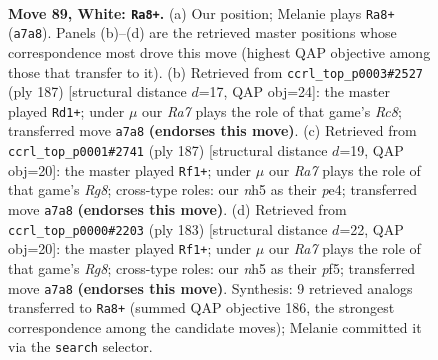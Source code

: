 \documentclass[11pt]{article}
\begin{document}
\clearpage

\begin{figure}[p]\centering
\begin{subfigure}{0.46\textwidth}\centering
\resizebox{\linewidth}{!}{%
\newchessgame
\chessboard[
  setfen={5k2/R7/8/7n/p6r/P7/7p/7K w - - 4 89},
  showmover=false,
  pgfstyle=straightmove, color=movearrow, markmove={a7-a8}
]}
\caption{}
\end{subfigure}\hfill
\begin{subfigure}{0.46\textwidth}\centering
\resizebox{\linewidth}{!}{%
\newchessgame
\chessboard[
  setfen={8/k7/P7/R1P5/3K4/8/8/2r5 b - - 28 94},
  showmover=false,
  pgfstyle=straightmove, color=movearrow, markmove={c1-d1}
]}
\caption{}
\end{subfigure}
\\[4pt]
\begin{subfigure}{0.46\textwidth}\centering
\resizebox{\linewidth}{!}{%
\newchessgame
\chessboard[
  setfen={8/6k1/4R1P1/8/4PK2/8/8/6r1 b - - 64 94},
  showmover=false,
  pgfstyle=straightmove, color=movearrow, markmove={g1-f1}
]}
\caption{}
\end{subfigure}\hfill
\begin{subfigure}{0.46\textwidth}\centering
\resizebox{\linewidth}{!}{%
\newchessgame
\chessboard[
  setfen={8/7k/7P/5P2/8/5K1R/8/6r1 b - - 0 92},
  showmover=false,
  pgfstyle=straightmove, color=movearrow, markmove={g1-f1}
]}
\caption{}
\end{subfigure}
\caption{\textbf{Move 89, White: \texttt{Ra8+}.} (a) Our position; Melanie plays \texttt{Ra8+} (\texttt{a7a8}). Panels (b)--(d) are the retrieved master positions whose correspondence most drove this move (highest QAP objective among those that transfer to it). (b) Retrieved from \texttt{ccrl\_top\_p0003\#2527} (ply 187) [structural distance $d$=17, QAP obj=24]: the master played \texttt{Rd1+}; under $\mu$ our \emph{Ra7} plays the role of that game's \emph{Rc8}; transferred move \texttt{a7a8} \textbf{(endorses this move)}. (c) Retrieved from \texttt{ccrl\_top\_p0001\#2741} (ply 187) [structural distance $d$=19, QAP obj=20]: the master played \texttt{Rf1+}; under $\mu$ our \emph{Ra7} plays the role of that game's \emph{Rg8}; cross-type roles: our \emph{n}h5 as their \emph{p}e4; transferred move \texttt{a7a8} \textbf{(endorses this move)}. (d) Retrieved from \texttt{ccrl\_top\_p0000\#2203} (ply 183) [structural distance $d$=22, QAP obj=20]: the master played \texttt{Rf1+}; under $\mu$ our \emph{Ra7} plays the role of that game's \emph{Rg8}; cross-type roles: our \emph{n}h5 as their \emph{p}f5; transferred move \texttt{a7a8} \textbf{(endorses this move)}. Synthesis: 9 retrieved analogs transferred to \texttt{Ra8+} (summed QAP objective 186, the strongest correspondence among the candidate moves); Melanie committed it via the \texttt{search} selector.}
\label{fig:thought-m176}
\end{figure}
\end{document}
